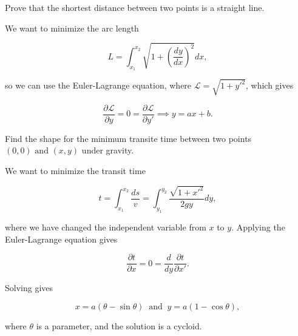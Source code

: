 \documentclass[a4paper,12pt]{report}
\begin{document}
{Prove that the shortest distance between two points is a straight line.}
{We want to minimize the arc length 

\begin{equation}
	L = \int_{x_1 }^{x_2 } \sqrt{1+ \left( \frac{dy}{dx}  \right)^2} dx,   
\end{equation}

so we can use the Euler-Lagrange equation, where \(\mathcal{L} = \sqrt{1+y'^2} \), which gives 

\begin{equation}
	\frac{\partial \mathcal{L}}{\partial y} = 0 = \frac{\partial \mathcal{L}}{\partial y'} \implies y = ax+b.
\end{equation}

} 

{Find the shape for the minimum transite time between two points \((0,0) \text { and } (x ,y )\) under gravity. }
{We want to minimize the transit time 

\begin{equation}
	t = \int_{x_1 }^{x_2 } \frac{ds}{v} = \int_{y_1 }^{y_2 } \frac{\sqrt{1+x'^2} }{2gy} dy,      
\end{equation}

where we have changed the independent variable from \(x\) to \(y\). Applying the Euler-Lagrange equation gives 

\begin{equation}
	\frac{\partial t}{\partial x} = 0 = \frac{d}{dy} \frac{\partial t}{\partial x' }.   
\end{equation}

Solving gives 

\begin{equation}
	x = a(\theta -\sin \theta ) ~\text { and }~ y = a(1-\cos \theta ), 
\end{equation}

where \(\theta \) is a parameter, and the solution is a cycloid. 
} 
\end{document}
